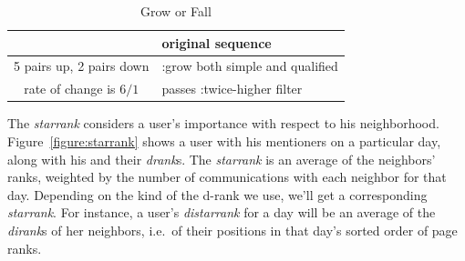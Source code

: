 \documentclass[10pt,oneside]{memoir}
\begin{document}
\begin{Spacing}{2}
\begin{table}
    \caption{Grow or Fall}
    \label{table:growfall}

    \centering

    \begin{tabular}{|c|p{2in}|}
    \hline
        [1 2 3 5 0 7 6] & original sequence\\
    \hline
         5 pairs up, 2 pairs down & :grow both simple and qualified \\
    \hline
        rate of change is $6/1$ & passes :twice-higher filter \\
    \hline
    \end{tabular}
\end{table}
The {\itshape starrank} considers a user's importance with respect to his neighborhood.  Figure~\ref{figure:starrank} shows a user with his mentioners on a particular day, along with his and their {\itshape drank}s.  The {\itshape starrank} is an average of the neighbors' ranks, weighted by the number of communications with each neighbor for that day.  Depending on the kind of the d-rank we use, we'll get a corresponding {\itshape starrank}.  For instance, a user's {\itshape distarrank} for a day will be an average of the {\itshape dirank}s of her neighbors, i.e.\ of their positions in that day's sorted order of page ranks.




\end{Spacing}
\end{document}
